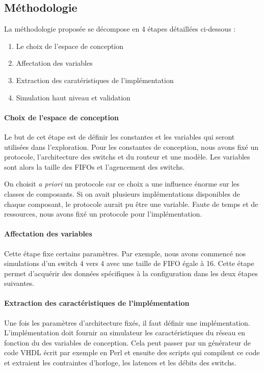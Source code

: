 \documentclass[11pt]{article}
\begin{document}
\subsection{Méthodologie}

La méthodologie proposée se décompose en 4 étapes détaillées ci-dessous :
\begin{enumerate}
\item Le choix de l'espace de conception
\item Affectation des variables
\item Extraction des caratéristiques de l'implémentation
\item Simulation haut niveau et validation
\end{enumerate}

\paragraph{Choix de l'espace de conception}
Le but de cet étape est de définir les constantes et les variables qui seront utilisées dans l'exploration. Pour les constantes de conception, nous avons fixé un protocole, l'architecture des switchs et du routeur et une modèle. Les variables sont alors la taille des FIFOs et l'agencement des switchs.
 
On choisit \textit{a priori} un protocole car ce choix a une influence énorme sur les classes de composants. Si on avait plusieurs implémentations disponibles de chaque composant, le protocole aurait pu être une variable. Faute de temps et de ressources, nous avons fixé un protocole pour l'implémentation.

\paragraph{Affectation des variables}
Cette étape fixe certains paramètres. Par exemple, nous avons commencé nos simulations d'un switch 4 vers 4 avec une taille de FIFO égale à 16. Cette étape permet d'acquérir des données spécifiques à la configuration dans les deux étapes suivantes.

\paragraph{Extraction des caractéristiques de l'implémentation}
Une fois les paramètres d'architecture fixés, il faut définir une implémentation. L'implémentation doit fournir au simulateur les caractéristiques du réseau en fonction du des variables de conception. Cela peut passer par un générateur de code VHDL écrit par exemple en Perl et ensuite des scripts qui compilent ce code et extraient les contraintes d'horloge, les latences et les débits des switchs.
\end{document}
